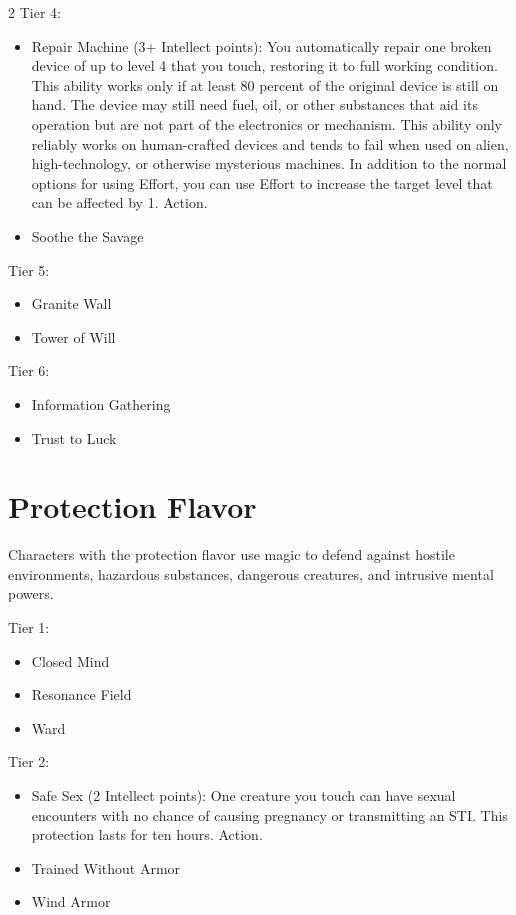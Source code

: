 \begin{multicols}{2}
Tier 4:
\begin{itemize}
\item Repair Machine (3+ Intellect points): You automatically repair one broken device of up to level 4 that you touch, restoring it to full working condition. This ability works only if at least 80 percent of the original device is still on hand. The device may still need fuel, oil, or other substances that aid its operation but are not part of the electronics or mechanism. This ability only reliably works on human-crafted devices and tends to fail when used on alien, high-technology, or otherwise mysterious machines. In addition to the normal options for using Effort, you can use Effort to increase the target level that can be affected by 1. Action. 
\item Soothe the Savage 
\end{itemize}

Tier 5:
\begin{itemize}
\item Granite Wall 
\item Tower of Will 
\end{itemize}

Tier 6:
\begin{itemize}
\item Information Gathering 
\item Trust to Luck
\end{itemize}

\section{Protection Flavor} 

Characters with the protection flavor use magic to defend against hostile environments, hazardous substances, dangerous creatures, and intrusive mental powers.

Tier 1:
\begin{itemize}
\item Closed Mind
\item Resonance Field
\item Ward 
\end{itemize}

Tier 2:
\begin{itemize}
\item Safe Sex (2 Intellect points): One creature you touch can have sexual encounters with no chance of causing pregnancy or transmitting an STI. This protection lasts for ten hours. Action. 
\item Trained Without Armor 
\item Wind Armor 
\end{itemize}


\end{multicols}
